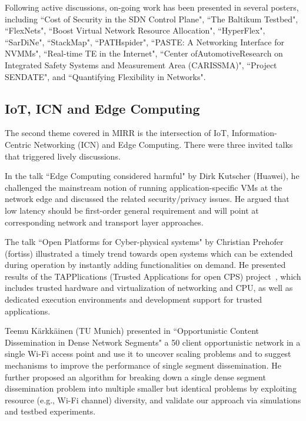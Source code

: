 
Following active discussions, on-going work has been presented in 
several posters, including 
``Cost of Security in the SDN Control Plane", ``The Baltikum Testbed",
``FlexNets", ``Boost Virtual Network Resource Allocation",
``HyperFlex", ``SarDiNe", ``StackMap", ``PATHspider",
``PASTE: A Networking Interface for NVMMs",
``Real-time TE in the Internet",
``Center ofAutomotiveResearch on Integrated Safety Systems
and Measurement Area (CARISSMA)",
``Project SENDATE", and
``Quantifying Flexibility in Networks".

\subsection{IoT, ICN and Edge Computing}

The second theme covered in MIRR is the intersection of IoT, Information-Centric
Networking (ICN) and Edge Computing. There were three invited talks that triggered
lively discussions. 

In the talk ``Edge Computing considered harmful" by Dirk
Kutscher (Huawei), he challenged the mainstream notion of running
application-specific VMs at the network edge and discussed the related
security/privacy issues. He argued that low latency should be first-order
general requirement and will point at corresponding network and
transport layer approaches.

The talk ``Open Platforms for Cyber-physical systems" by Christian Prehofer (fortiss)
illustrated a timely trend towards open systems
which can be extended during operation by instantly adding functionalities on
demand. He presented results of the
TAPPlications (Trusted Applications for open CPS) project~\cite{prehofer:eitec:2016},
which includes trusted hardware and
virtualization of networking and CPU, as well as dedicated execution
environments and development support for trusted applications.

Teemu Kärkkäinen (TU Munich) presented in ``Opportunistic Content
Dissemination in Dense Network Segments" a 50 client opportunistic network in
a single Wi-Fi access point and use it to uncover scaling problems and to suggest
mechanisms to improve the performance of single segment dissemination. He further
proposed an algorithm for breaking down a single dense segment dissemination
problem into multiple smaller but identical problems by exploiting resource 
(e.g., Wi-Fi channel) diversity, and validate our approach via simulations and
testbed experiments.

